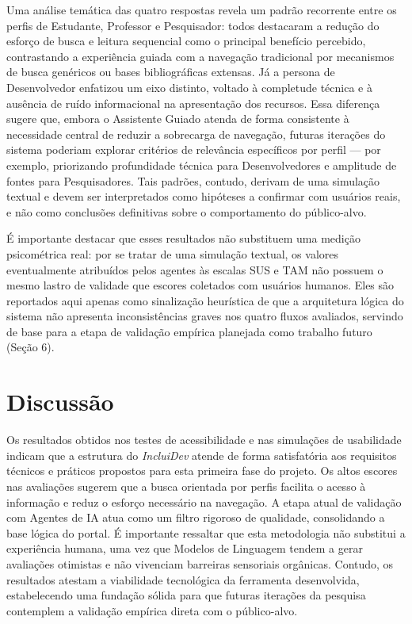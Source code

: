 \documentclass[12pt]{article}
\begin{document}
Uma análise temática das quatro respostas revela um padrão recorrente entre os perfis de Estudante, Professor e Pesquisador: todos destacaram a redução do esforço de busca e leitura sequencial como o principal benefício percebido, contrastando a experiência guiada com a navegação tradicional por mecanismos de busca genéricos ou bases bibliográficas extensas. Já a persona de Desenvolvedor enfatizou um eixo distinto, voltado à completude técnica e à ausência de ruído informacional na apresentação dos recursos. Essa diferença sugere que, embora o Assistente Guiado atenda de forma consistente à necessidade central de reduzir a sobrecarga de navegação, futuras iterações do sistema poderiam explorar critérios de relevância específicos por perfil --- por exemplo, priorizando profundidade técnica para Desenvolvedores e amplitude de fontes para Pesquisadores. Tais padrões, contudo, derivam de uma simulação textual e devem ser interpretados como hipóteses a confirmar com usuários reais, e não como conclusões definitivas sobre o comportamento do público-alvo.

É importante destacar que esses resultados não substituem uma medição psicométrica real: por se tratar de uma simulação textual, os valores eventualmente atribuídos pelos agentes às escalas SUS e TAM não possuem o mesmo lastro de validade que escores coletados com usuários humanos. Eles são reportados aqui apenas como sinalização heurística de que a arquitetura lógica do sistema não apresenta inconsistências graves nos quatro fluxos avaliados, servindo de base para a etapa de validação empírica planejada como trabalho futuro (Seção 6).

\section{Discussão}
Os resultados obtidos nos testes de acessibilidade e nas simulações de usabilidade indicam que a estrutura do \textit{IncluiDev} atende de forma satisfatória aos requisitos técnicos e práticos propostos para esta primeira fase do projeto. Os altos escores nas avaliações sugerem que a busca orientada por perfis facilita o acesso à informação e reduz o esforço necessário na navegação. A etapa atual de validação com Agentes de IA atua como um filtro rigoroso de qualidade, consolidando a base lógica do portal. É importante ressaltar que esta metodologia não substitui a experiência humana, uma vez que Modelos de Linguagem tendem a gerar avaliações otimistas e não vivenciam barreiras sensoriais orgânicas. Contudo, os resultados atestam a viabilidade tecnológica da ferramenta desenvolvida, estabelecendo uma fundação sólida para que futuras iterações da pesquisa contemplem a validação empírica direta com o público-alvo.
\end{document}
